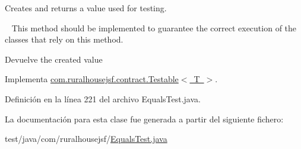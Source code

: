 Creates and returns a value used for testing. 

~\newline
 This method should be implemented to guarantee the correct execution of the classes that rely on this method.

\begin{DoxyReturn}{Devuelve}
the created value 
\end{DoxyReturn}


Implementa \mbox{\hyperlink{a00244_ae4546a381488faaba1ef7c0f8688de9c}{com.\+ruralhousejsf.\+contract.\+Testable$<$ T $>$}}.



Definición en la línea 221 del archivo Equals\+Test.\+java.



La documentación para esta clase fue generada a partir del siguiente fichero\+:\begin{DoxyCompactItemize}
\item 
test/java/com/ruralhousejsf/\mbox{\hyperlink{a00092}{Equals\+Test.\+java}}\end{DoxyCompactItemize}
